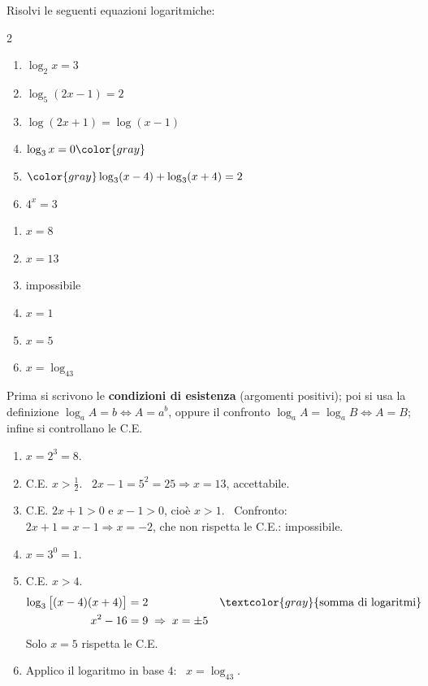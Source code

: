 \begin{question}[ID=2.1, subtitle={Equazioni logaritmiche elementari}, difficulty=facile, tags={equazioni logaritmiche, definizione}]
Risolvi le seguenti equazioni logaritmiche:
\begin{center}\begin{minipage}{0.92\linewidth}
\begin{multicols}{2}
\begin{enumerate}[leftmargin=3.2cm]
\item $\log_2 x = 3$
\item $\log_5(2x-1) = 2$
\item $\log(2x+1) = \log(x-1)$
\item $\log_3 x = 0 \color{gray}$
\item $\color{gray}\log_3(x-4) + \log_3(x+4) = 2$
\item $4^x = 3$
\end{enumerate}
\end{multicols}
\end{minipage}\end{center}
\begin{solution}
\begin{enumerate}
    \item $x=8$
    \item $x=13$
    \item impossibile
    \item $x=1$
    \item $x=5$
    \item $x=\log_43$
\end{enumerate}
\end{solution}
\begin{explanation}
Prima si scrivono le \textbf{condizioni di esistenza} (argomenti positivi); poi si usa la definizione $\log_a A=b \iff A=a^b$, oppure il confronto $\log_aA=\log_aB \iff A=B$; infine si controllano le C.E.
\begin{enumerate}
    \item $x=2^3=8$.
    \item C.E. $x>\tfrac12$. \ $2x-1=5^2=25 \Rightarrow x=13$, accettabile.
    \item C.E. $2x+1>0$ e $x-1>0$, cioè $x>1$. \ Confronto: $2x+1=x-1 \Rightarrow x=-2$, che non rispetta le C.E.: impossibile.
    \item $x=3^0=1$.
    \item C.E. $x>4$.
    \[\begin{aligned}
    \log_3\big[(x-4)(x+4)\big] &= 2 && \textcolor{gray}{\text{somma di logaritmi}}\\
    x^2-16 &= 9 \;\Rightarrow\; x=\pm5
    \end{aligned}\]
    Solo $x=5$ rispetta le C.E.
    \item Applico il logaritmo in base $4$: \ $x=\log_43$.
\end{enumerate}
\end{explanation}
\end{question}

